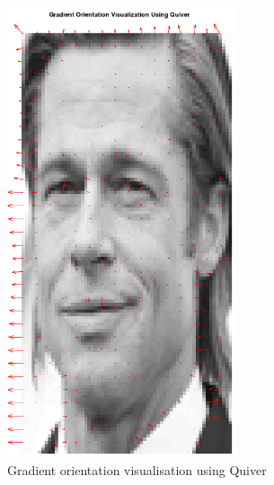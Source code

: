 \documentclass[a4paper]{article}
\begin{document}
\begin{minipage}{0.49\textwidth}
\begin{figure}[H]
    \centering
    \includegraphics[width=0.6\textwidth]{./images/2_1_gradient_orientation.png}
    \caption{Gradient orientation visualisation using Quiver}
\end{figure}
\end{minipage}
\hfill
\end{document}
